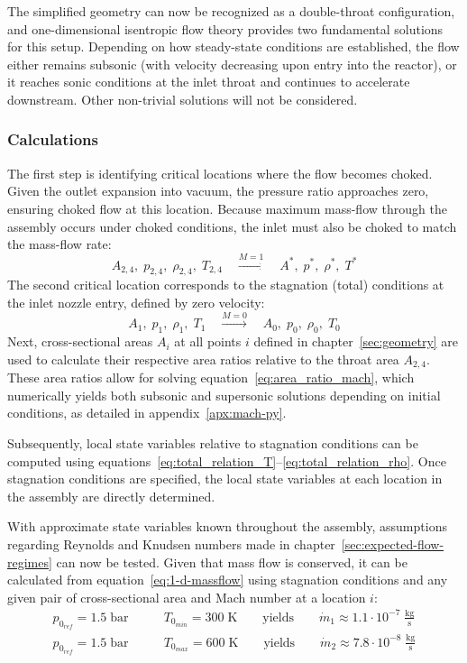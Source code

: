 The simplified geometry can now be recognized as a double-throat configuration, and one-dimensional isentropic flow theory provides two fundamental solutions for this setup.
Depending on how steady-state conditions are established, the flow either remains subsonic (with velocity decreasing upon entry into the reactor), or it reaches sonic conditions at the inlet throat and continues to accelerate downstream.
Other non-trivial solutions will not be considered.
\cite{SALAS1986193, EMMONS1958}

\subsubsection*{Calculations}
	The first step is identifying critical locations where the flow becomes choked.
	Given the outlet expansion into vacuum, the pressure ratio approaches zero, ensuring choked flow at this location.
	Because maximum mass-flow through the assembly occurs under choked conditions, the inlet must also be choked to match the mass-flow rate:
	$$
		A_{2,4},\;p_{2,4},\;\rho_{2,4},\;T_{2,4}
			\quad \xrightarrow {M = 1} \quad
		A^*,\;p^*,\;\rho^*,\;T^*
	$$
	The second critical location corresponds to the stagnation (total) conditions at the inlet nozzle entry, defined by zero velocity:
	$$
		A_1,\;p_1,\;\rho_1,\;T_1
			\quad \xrightarrow{M=0} \quad
		A_0,\;p_0,\;\rho_0,\;T_0
	$$
	Next, cross-sectional areas $A_i$ at all points $i$ defined in chapter~\ref{sec:geometry} are used to calculate their respective area ratios relative to the throat area $A_{2,4}$.
	These area ratios allow for solving equation~\eqref{eq:area_ratio_mach}, which numerically yields both subsonic and supersonic solutions depending on initial conditions, as detailed in appendix~\ref{apx:mach-py}.

	Subsequently, local state variables relative to stagnation conditions can be computed using equations~\eqref{eq:total_relation_T}–\eqref{eq:total_relation_rho}.
	Once stagnation conditions are specified, the local state variables at each location in the assembly are directly determined.

	

	With approximate state variables known throughout the assembly, assumptions regarding Reynolds and Knudsen numbers made in chapter~\ref{sec:expected-flow-regimes} can now be tested.
	Given that mass flow is conserved, it can be calculated from equation~\eqref{eq:1-d-massflow} using stagnation conditions and any given pair of cross-sectional area and Mach number at a location $i$:
	\begin{align*}
		p_{0_{ref}} = 1.5\;\text{bar}
			&\qquad T_{0_{min}} = 300\;\text{K}
				\qquad \text{yields} \qquad
			\dot{m}_1 \approx 1.1 \cdot 10^{-7} \; \frac{\text{kg}}{\text{s}}\\
		p_{0_{ref}} = 1.5\;\text{bar}
			&\qquad T_{0_{max}} = 600\;\text{K}
				\qquad \text{yields} \qquad
			\dot{m}_2 \approx 7.8 \cdot 10^{-8} \; \frac{\text{kg}}{\text{s}}
	\end{align*}


